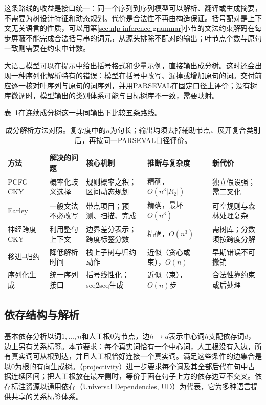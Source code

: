 这条路线的收益是接口统一：同一个序列到序列模型可以解析、翻译或生成摘要，不需要为树设计特征和动态规划。代价是合法性不再由构造保证。括号配对是上下文无关语言的性质，可以用第\ref{sec:nlp-inference-grammar}小节的文法约束解码在每步屏蔽不能完成合法括号串的词元，从源头排除不配对的输出；叶节点个数与原句一致则需要在约束中计数。

大语言模型可以在提示中给出括号格式和少量示例，直接输出成分树。这时还会出现一种序列化解析特有的错误：模型在括号中改写、漏掉或增加原句的词。交付前应逐一核对叶序列与原句的词序列，并用PARSEVAL在固定口径上评价；没有树库微调时，模型输出的类别体系可能与目标树库不一致，需要映射。

表~\ref{tab:nlp-analysis-constituency-methods}在连续成分树这一共同输出下比较五条路线。

\begin{table}[htbp]
  \centering
  \begin{tabularx}{\linewidth}{@{}l XXXX@{}}
    \toprule
    方法&解决的问题&核心机制&推断与复杂度&新代价\\
    \midrule
    PCFG--CKY&概率化歧义选择&规则概率之积；区间动态规划&精确，$O(n^3|R_2|)$&独立假设强；需二叉化\\
    Earley&一般文法不必改写&带点项目；预测、扫描、完成&精确，最坏$O(n^3)$&可空规则与森林处理复杂\\
    神经跨度--CKY&利用整句上下文&边界差分表示；跨度标签分数&精确，$O(n^3)$&需树库；分数须按跨度分解\\
    移进--归约&降低解析时间&栈上子树与归约动作&近似（贪心或束），$O(n)$&早期错误不可撤销\\
    序列化生成&统一序列接口&括号线性化；seq2seq生成&近似（束），$O(n)$步&合法性靠约束或后处理\\
    \bottomrule
  \end{tabularx}
  \caption{成分解析方法对照。复杂度中的$n$为句长；输出均须去掉辅助节点、展开复合类别后，再按同一PARSEVAL口径评价。}
  \label{tab:nlp-analysis-constituency-methods}
\end{table}

\subsection{依存结构与解析}
\label{sec:nlp-analysis-dependency}

基本依存分析以词$1,\ldots,n$和人工根0为节点，边$h\to d$表示中心词$h$支配依存词$d$，边上另有关系标签。本节要求：每个真实词恰有一个中心词，人工根没有入边，所有真实词可从根到达，并且人工根恰好连接一个真实词。满足这些条件的边集合是以0为根的有向生成树。（projectivity）进一步要求每个词及其全部后代在句中占据连续区间；把人工根放在最左侧时，等价于画在句子上方的依存边互不交叉。依存标注资源以通用依存（Universal Dependencies, UD）为代表，它为多种语言提供共享的关系标签体系。

